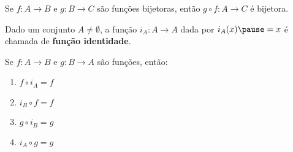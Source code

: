\documentclass{beamer}
\begin{document}
    \begin{frame}
        \begin{corolario}
            Se $f : A \to B$ \pause e $g : B \to C$ \pause são funções bijetoras, \pause então $g\circ f : A \to C$ \pause é bijetora.
        \end{corolario}
    \end{frame}

    \begin{frame}
        \begin{definicao}
            Dado um conjunto $A \ne \emptyset$, \pause a função $i_{A}: A \to A$ \pause dada por $i_{A}(x) \pause = x$ \pause é chamada de \pause \textbf{função identidade}.
        \end{definicao}
    \end{frame}

    \begin{frame}
        \begin{proposicao}
            Se $f : A \to B$ \pause e $g : B \to A$ \pause são funções, \pause então:\pause
            \begin{enumerate}[label={\roman*})]
                \item $f\circ i_{A} = f$\pause

                \vspace{.3cm}

                \item $i_{B}\circ f = f$\pause

                \vspace{.3cm}

                \item $g\circ i_{B} = g$\pause

                \vspace{.3cm}

                \item $i_{A}\circ g = g$\pause
            \end{enumerate}
        \end{proposicao}
    \end{frame}
\end{document}
